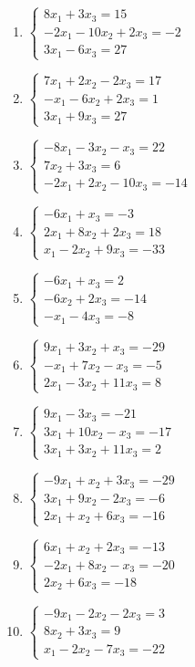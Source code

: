 \begin{enumerate}[label=\arabic*., leftmargin=*]
\item $\begin{cases}8x_1+3x_3=15\\-2x_1-10x_2+2x_3=-2\\3x_1-6x_3=27\end{cases}$
\item $\begin{cases}7x_1+2x_2-2x_3=17\\-x_1-6x_2+2x_3=1\\3x_1+9x_3=27\end{cases}$
\item $\begin{cases}-8x_1-3x_2-x_3=22\\7x_2+3x_3=6\\-2x_1+2x_2-10x_3=-14\end{cases}$
\item $\begin{cases}-6x_1+x_3=-3\\2x_1+8x_2+2x_3=18\\x_1-2x_2+9x_3=-33\end{cases}$
\item $\begin{cases}-6x_1+x_3=2\\-6x_2+2x_3=-14\\-x_1-4x_3=-8\end{cases}$
\item $\begin{cases}9x_1+3x_2+x_3=-29\\-x_1+7x_2-x_3=-5\\2x_1-3x_2+11x_3=8\end{cases}$
\item $\begin{cases}9x_1-3x_3=-21\\3x_1+10x_2-x_3=-17\\3x_1+3x_2+11x_3=2\end{cases}$
\item $\begin{cases}-9x_1+x_2+3x_3=-29\\3x_1+9x_2-2x_3=-6\\2x_1+x_2+6x_3=-16\end{cases}$
\item $\begin{cases}6x_1+x_2+2x_3=-13\\-2x_1+8x_2-x_3=-20\\2x_2+6x_3=-18\end{cases}$
\item $\begin{cases}-9x_1-2x_2-2x_3=3\\8x_2+3x_3=9\\x_1-2x_2-7x_3=-22\end{cases}$

\end{enumerate}
